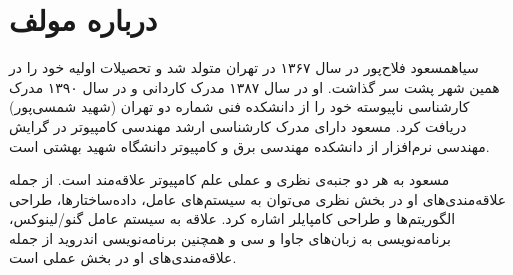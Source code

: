 \section*{درباره مولف}
‌سیاه{مسعود فلاح‌پور} در سال ۱۳۶۷ در تهران متولد شد و تحصیلات اولیه خود را در همین شهر پشت سر گذاشت. او در سال ۱۳۸۷ مدرک کاردانی و در سال ۱۳۹۰ مدرک کارشناسی ناپیوسته خود را از دانشکده فنی شماره دو تهران (شهید شمسی‌پور) دریافت کرد. مسعود دارای مدرک کارشناسی ارشد مهندسی کامپیوتر در گرایش مهندسی نرم‌افزار از دانشکده مهندسی برق و کامپیوتر دانشگاه شهید بهشتی است.

مسعود به هر دو جنبه‌ی نظری و عملی علم کامپیوتر علاقه‌مند است. از جمله علاقه‌مندی‌های او در بخش نظری می‌توان به سیستم‌های عامل، داده‌ساختارها، طراحی الگوریتم‌ها و طراحی کامپایلر اشاره کرد. علاقه به سیستم‌ عامل گنو/لینوکس، برنامه‌نویسی به زبان‌های جاوا و سی و همچنین برنامه‌نویسی اندروید از جمله علاقه‌مندی‌های او در بخش عملی است.
\newpage